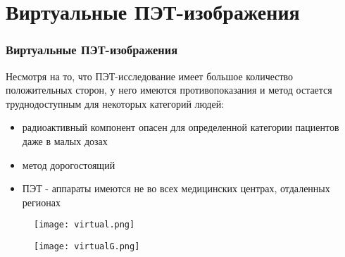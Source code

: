 
\section{Виртуальные ПЭТ-изображения}


\begin{frame}
    \frametitle{Виртуальные ПЭТ-изображения}
    Несмотря на то, что ПЭТ-исследование имеет большое количество положительных сторон, у него имеются противопоказания и метод остается труднодоступным для некоторых категорий людей:
    \begin{itemize}
        \item радиоактивный компонент опасен для определенной категории пациентов даже в малых дозах
        \item метод дорогостоящий
        \item ПЭТ - аппараты имеются не во всех медицинских центрах, отдаленных регионах
    \end{itemize}

\end{frame}

\begin{frame}
    \begin{figure}
        \texttt{[image: virtual.png]}
    \end{figure}
\end{frame}

\begin{frame}
    \begin{figure}
        \texttt{[image: virtualG.png]}
    \end{figure}
\end{frame}


